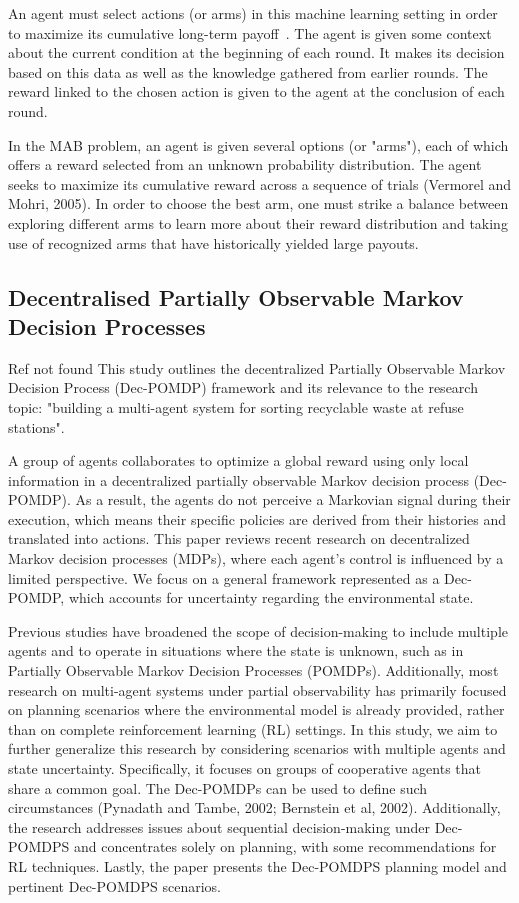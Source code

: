 \documentclass[a4paper,11pt,onecolumn]{article}
\begin{document}
An agent must select actions (or arms) in this machine learning setting in order to maximize its cumulative long-term payoff~\cite{zhao:2025}. The agent is given some context about the current condition at the beginning of each round. It makes its decision based on this data as well as the knowledge gathered from earlier rounds. The reward linked to the chosen action is given to the agent at the conclusion of each round.

In the MAB problem, an agent is given several options (or "arms"), each of which offers a reward selected from an unknown probability distribution. The agent seeks to maximize its cumulative reward across a sequence of trials (Vermorel and Mohri, 2005). In order to choose the best arm, one must strike a balance between exploring different arms to learn more about their reward distribution and taking use of recognized arms that have historically yielded large payouts.


\subsection{Decentralised Partially Observable Markov Decision Processes}
\label{sub:lit-rev_dec-pomdp}

Ref not found
This study outlines the decentralized Partially Observable Markov Decision Process (Dec-POMDP) framework and its relevance to the research topic: "building a multi-agent system for sorting recyclable waste at refuse stations".


A group of agents collaborates to optimize a global reward using only local information in a decentralized partially observable Markov decision process (Dec-POMDP). As a result, the agents do not perceive a Markovian signal during their execution, which means their specific policies are derived from their histories and translated into actions. This paper reviews recent research on decentralized Markov decision processes (MDPs), where each agent's control is influenced by a limited perspective. We focus on a general framework represented as a Dec-POMDP, which accounts for uncertainty regarding the environmental state.


Previous studies have broadened the scope of decision-making to include multiple agents and to operate in situations where the state is unknown, such as in Partially Observable Markov Decision Processes (POMDPs). Additionally, most research on multi-agent systems under partial observability has primarily focused on planning scenarios where the environmental model is already provided, rather than on complete reinforcement learning (RL) settings. In this study, we aim to further generalize this research by considering scenarios with multiple agents and state uncertainty. Specifically, it focuses on groups of cooperative agents that share a common goal. The Dec-POMDPs can be used to define such circumstances (Pynadath and Tambe, 2002; Bernstein et al, 2002).  Additionally, the research addresses issues about sequential decision-making under Dec-POMDPS and concentrates solely on planning, with some recommendations for RL techniques. Lastly, the paper presents the Dec-POMDPS planning model and pertinent Dec-POMDPS scenarios.
\end{document}
